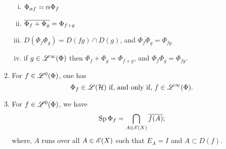 \begin{thrm}
\begin{enumerate}
\begin{enumerate}[(i)]
  \item $\Phi_{\alpha f} = \alpha \Phi_f$
  \item $ \overline{\Phi_f + \Phi_g} = \Phi_{f + g}$
  \item $D(\Phi_f \Phi_g) = D(fg) \cap D(g)$, and $\overline{\Phi_f \Phi_g} = \Phi_{fg}$
  \item if $g \in \mathscr{L}^\infty (\Phi)$ then $\Phi_f + \Phi_g = \Phi_{f+g}$, and $\Phi_f \Phi_g = \Phi_{fg}$.
\end{enumerate}

\item
For $f \in \mathscr{L}^0(\Phi)$, one has
\[
\Phi_f \in \mathscr{L}(\mathcal{H}) \text{ if, and only if, } f \in \mathscr{L}^\infty (\Phi).
\]

\item
For $f \in \mathscr{L}^0(\Phi)$, we have
\[
\operatorname{Sp} \Phi_f = \bigcap_{A \in \mathscr{E}(X)} \overline{f(A)};
\]
where, $A$ runs over all $A \in \mathscr{E}(X)$ such that $E_A = I$ and $A \subset D(f)$.


\end{enumerate}

\end{thrm}












